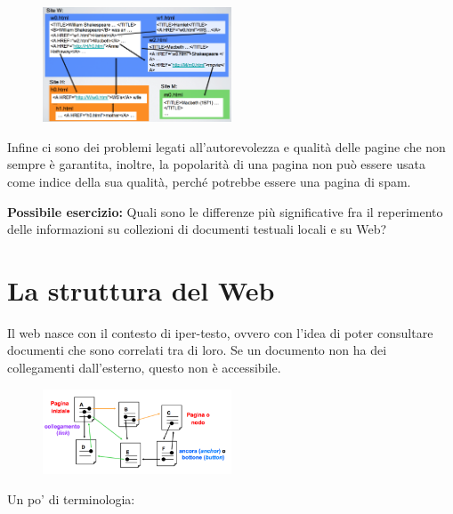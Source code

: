 \begin{figure}[htbp]
	\centering
	\includegraphics[width=0.5\textwidth]{images/l17-fig-1.png}
\end{figure}

Infine ci sono dei problemi legati all'autorevolezza e qualità delle pagine che non sempre è garantita, inoltre, la popolarità di una pagina non può essere usata come indice della sua qualità, perché potrebbe essere una pagina di spam.

\textbf{{\color{Red} Possibile esercizio:}} Quali sono le differenze più significative fra il reperimento delle informazioni su collezioni di documenti testuali locali e su Web?

\section{La struttura del Web}

Il web nasce con il contesto di iper-testo, ovvero con l'idea di poter consultare documenti che sono correlati tra di loro. Se un documento non ha dei collegamenti dall'esterno, questo non è accessibile.

\begin{figure}[htbp]
	\centering
	\includegraphics[width = 0.5\textwidth]{images/l17-fig-2}
\end{figure}

Un po' di terminologia:

